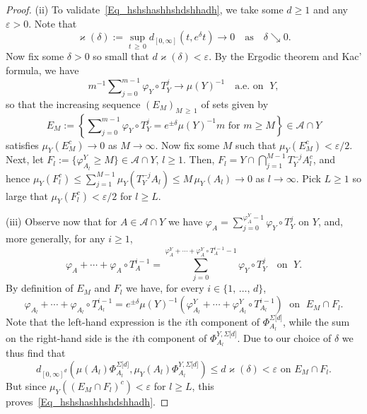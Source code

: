 \documentclass[AHL,Unicode,longabstracts]{cedram}
\newcommand{\clA}{\mathcal{A}}
\begin{document}
\begin{proof}
\noindent(ii)  To validate~\eqref{Eq_hshshashhshdshhadh}, we take some $d\geq1$ and any $\varepsilon>0$. Note that 
\[
\varkappa(\delta):=\sup_{t\,\geq\,0}d_{[0,\infty]}\left(t,e^{\delta}t\right)\rightarrow0\quad \text{as}\quad\delta\searrow0.
\]
Now fix some $\delta>0$ so small that $d\varkappa(\delta)<\varepsilon$. By the Ergodic theorem and Kac' formula, we have
\begin{equation}
m^{-1} {\textstyle\sum\nolimits_{j=0}^{m-1}}
\varphi_{Y}\circ T_{Y}^{j}\longrightarrow\mu(Y)^{-1}\quad\text{a.e. on }\;Y,
\end{equation}
so that the increasing sequence $(E_{M})_{M\,\geq\,1}$ of sets given by
\[
E_{M}:=\left\{ {\textstyle\sum\nolimits_{j=0}^{m-1}}
\varphi_{Y}\circ T_{Y}^{j}=e^{\pm\delta}\mu(Y)^{-1}m\text{ for }m\geq M\right\}\in\clA\cap Y
\]
satisfies $\mu_{Y}(E_{M}^{c})\rightarrow0$ as $M\rightarrow\infty$. Now fix some $M$ such that $\mu_{Y}(E_{M}^{c})<\varepsilon/2$. Next, let $F_{l}:=\{\varphi_{A_{l}}^{Y}\geq M\}\in\clA\cap Y$, $l\geq1$. Then, $F_{l}=Y\cap {\textstyle\bigcap\nolimits_{j=1}^{M-1}} T_{Y}^{-j}A_{l}^{c}$, and hence $\mu_{Y}(F_{l}^{c})\leq\sum_{j=1}^{M-1}\mu _{Y}(T_{Y}^{-j}A_{l})\leq M\,\mu_{Y}(A_{l})\rightarrow0$ as $l\rightarrow
\infty$. Pick $L\geq1$ so large that $\mu_{Y}(F_{l}^{c})<\varepsilon/2$ for $l\geq L$.

\vspace{6pt}
\noindent(iii) Observe now that for $A\in
\clA\cap Y$ we have $\varphi_{A}=\sum_{j=0}^{\varphi_{A}^{Y}-1}
\varphi_{Y}\circ T_{Y}^{j}\,\ $on $Y$, and, more generally, for any $i\geq1$,
\begin{equation}
\varphi_{A}+\cdots+\varphi_{A}\circ T_{A}^{i-1}=\sum_{j=0}^{\varphi_{A} ^{Y}+\cdots+\varphi_{A}^{Y}\circ T_{A}^{i-1}-1}\varphi_{Y}\circ T_{Y} ^{j} \quad \text{on }\; Y.
\end{equation}
By definition of $E_{M}$ and $F_{l}$ we have, for every $i\in\{1,\,\ldots,\,d\}$,
\[
\varphi_{A_{l}}+\cdots+\varphi_{A_{l}}\circ T_{A_{l}}^{i-1}=e^{\pm\delta}
\mu(Y)^{-1}\left(\varphi_{A_{l}}^{Y}+\cdots+\varphi_{A_{l}}^{Y}\circ T_{A_{l}}^{i-1}\right)\; \text{ on }\; E_{M}\cap F_{l}.
\]
Note that the left-hand expression is the $i$th component of $\Phi_{A_{l} }^{\Sigma\lbrack d]}$, while the sum on the right-hand side is the $i$th component of $\Phi_{A_{l}}^{Y,\Sigma\lbrack d]}$. Due to our choice of $\delta$ we thus find that
\[
d_{[0,\infty]^{d}}\left(\mu(A_{l})\Phi_{A_{l}}^{\Sigma\lbrack d]},\mu _{Y}(A_{l})\Phi_{A_{l}}^{Y,\Sigma\lbrack d]}\right) \leq d\varkappa (\delta)<\varepsilon\text{ on }E_{M}\cap F_{l}\text{.}
\]
But since $\mu_{Y}((E_{M}\cap F_{l})^{c})<\varepsilon$ for $l\geq L$, this proves~\eqref{Eq_hshshashhshdshhadh}.\qedhere
\end{proof}
\end{document}
